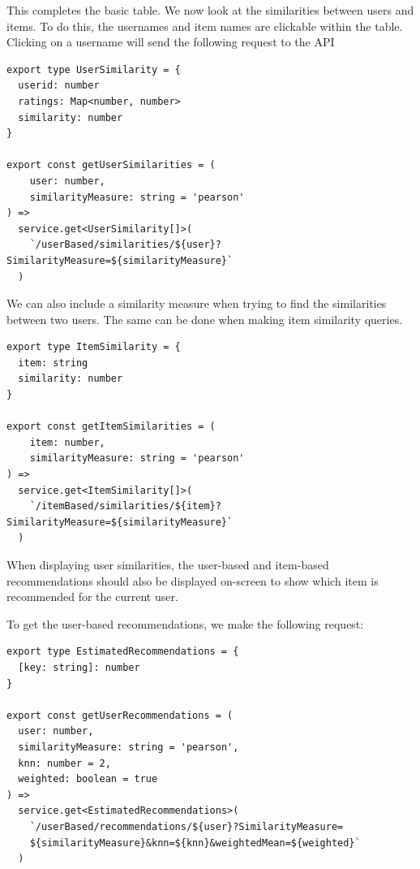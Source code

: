 This completes the basic table. We now look at the similarities between users and items. To do this, the usernames and item names are clickable within the table. Clicking on a username will send the following request to the API

\begin{verbatim}
export type UserSimilarity = {
  userid: number
  ratings: Map<number, number>
  similarity: number
}

export const getUserSimilarities = (
    user: number, 
    similarityMeasure: string = 'pearson'
) =>
  service.get<UserSimilarity[]>(
    `/userBased/similarities/${user}?SimilarityMeasure=${similarityMeasure}`
  )
\end{verbatim}

We can also include a similarity measure when trying to find the similarities between two users. The same can be done when making item similarity queries.

\begin{verbatim}
export type ItemSimilarity = {
  item: string
  similarity: number
}

export const getItemSimilarities = (
    item: number, 
    similarityMeasure: string = 'pearson'
) =>
  service.get<ItemSimilarity[]>(
    `/itemBased/similarities/${item}?SimilarityMeasure=${similarityMeasure}`
  )
\end{verbatim}

When displaying user similarities, the user-based and item-based recommendations should also be displayed on-screen to show which item is recommended for the current user.


To get the user-based recommendations, we make the following request:

\newpage

\begin{verbatim}
export type EstimatedRecommendations = {
  [key: string]: number
}

export const getUserRecommendations = (
  user: number,
  similarityMeasure: string = 'pearson',
  knn: number = 2,
  weighted: boolean = true
) =>
  service.get<EstimatedRecommendations>(
    `/userBased/recommendations/${user}?SimilarityMeasure=
    ${similarityMeasure}&knn=${knn}&weightedMean=${weighted}`
  )
\end{verbatim}

